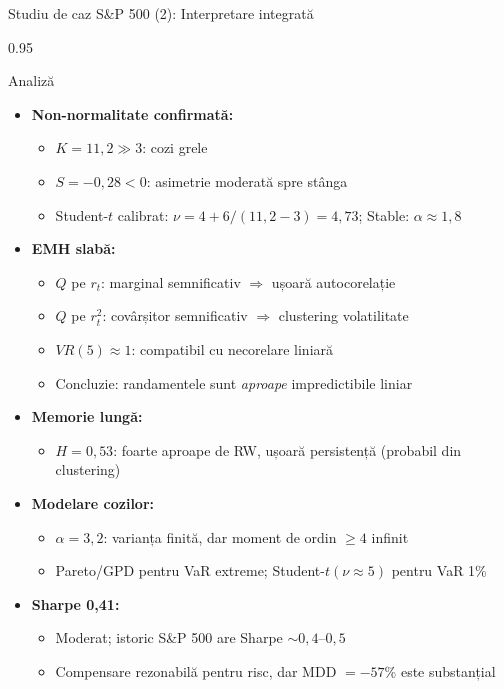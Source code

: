 \documentclass[9pt, aspectratio=169, t]{beamer}
\begin{document}
\begin{frame}[shrink=25]{Studiu de caz S\&P 500 (2): Interpretare integrată}
\begin{cminipage}{0.95\textwidth}
\begin{exampleblock}{Analiză}
\begin{itemize}\setlength{\itemsep}{0pt}
    \item \textbf{Non-normalitate confirmată:}
    \begin{itemize}\setlength{\itemsep}{0pt}
        \item $K = 11{,}2 \gg 3$: cozi grele
        \item $S = -0{,}28 < 0$: asimetrie moderată spre stânga
        \item Student-$t$ calibrat: $\nu = 4 + 6/(11{,}2-3) = 4{,}73$; Stable: $\alpha \approx 1{,}8$
    \end{itemize}
    \item \textbf{EMH slabă:}
    \begin{itemize}\setlength{\itemsep}{0pt}
        \item $Q$ pe $r_t$: marginal semnificativ $\Rightarrow$ ușoară autocorelație
        \item $Q$ pe $r_t^2$: covârșitor semnificativ $\Rightarrow$ clustering volatilitate
        \item $VR(5) \approx 1$: compatibil cu necorelare liniară
        \item Concluzie: randamentele sunt \emph{aproape} impredictibile liniar
    \end{itemize}
    \item \textbf{Memorie lungă:}
    \begin{itemize}\setlength{\itemsep}{0pt}
        \item $H = 0{,}53$: foarte aproape de RW, ușoară persistență (probabil din clustering)
    \end{itemize}
    \item \textbf{Modelare cozilor:}
    \begin{itemize}\setlength{\itemsep}{0pt}
        \item $\alpha = 3{,}2$: varianța finită, dar moment de ordin $\ge 4$ infinit
        \item Pareto/GPD pentru VaR extreme; Student-$t(\nu \approx 5)$ pentru VaR 1\%
    \end{itemize}
    \item \textbf{Sharpe 0,41:}
    \begin{itemize}\setlength{\itemsep}{0pt}
        \item Moderat; istoric S\&P 500 are Sharpe $\sim 0{,}4$--$0{,}5$
        \item Compensare rezonabilă pentru risc, dar MDD $= -57\%$ este substanțial
    \end{itemize}
\end{itemize}
\end{exampleblock}
\end{cminipage}
\end{frame}
\end{document}
